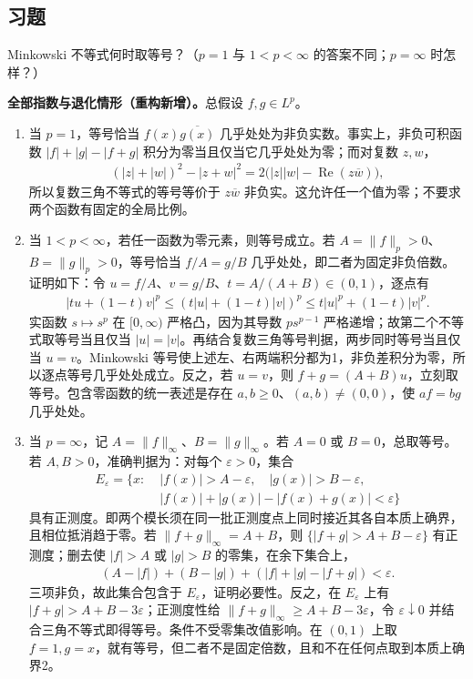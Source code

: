 \documentclass[../../main.tex]{subfiles}
\begin{document}
\subsection*{习题}
\begin{exercise}\label{exercise:ch06-minkowski-equality}
Minkowski 不等式何时取等号？（$p=1$ 与 $1<p<\infty$ 的答案不同；$p=\infty$ 时怎样？）
\end{exercise}
\begin{solution}
\textbf{全部指数与退化情形（重构新增）。}总假设 $f,g\in L^p$。
\begin{enumerate}
\item 当 $p=1$，等号恰当 $f(x)\overline{g(x)}$ 几乎处处为非负实数。事实上，非负可积函数 $|f|+|g|-|f+g|$ 积分为零当且仅当它几乎处处为零；而对复数 $z,w$，
\begin{align*}
(|z|+|w|)^2-|z+w|^2=2\bigl(|z||w|-\operatorname{Re}(z\overline w)\bigr),
\end{align*}
所以复数三角不等式的等号等价于 $z\overline w$ 非负实。这允许任一个值为零；不要求两个函数有固定的全局比例。
\item 当 $1<p<\infty$，若任一函数为零元素，则等号成立。若 $A=\|f\|_p>0$、$B=\|g\|_p>0$，等号恰当 $f/A=g/B$ 几乎处处，即二者为固定非负倍数。证明如下：令 $u=f/A$、$v=g/B$、$t=A/(A+B)\in(0,1)$，逐点有
\begin{align*}
|tu+(1-t)v|^p
\leqslant(t|u|+(1-t)|v|)^p
\leqslant t|u|^p+(1-t)|v|^p.
\end{align*}
实函数 $s\mapsto s^p$ 在 $[0,\infty)$ 严格凸，因为其导数 $ps^{p-1}$ 严格递增；故第二个不等式取等号当且仅当 $|u|=|v|$。再结合复数三角等号判据，两步同时等号当且仅当 $u=v$。Minkowski 等号使上述左、右两端积分都为1，非负差积分为零，所以逐点等号几乎处处成立。反之，若 $u=v$，则 $f+g=(A+B)u$，立刻取等号。包含零函数的统一表述是存在 $a,b\geqslant0$、$(a,b)\ne(0,0)$，使 $af=bg$ 几乎处处。
\item 当 $p=\infty$，记 $A=\|f\|_\infty$、$B=\|g\|_\infty$。若 $A=0$ 或 $B=0$，总取等号。若 $A,B>0$，准确判据为：对每个 $\varepsilon>0$，集合
\begin{align*}
E_\varepsilon=\{x:\;&|f(x)|>A-\varepsilon,\quad |g(x)|>B-\varepsilon,\\
&|f(x)|+|g(x)|-|f(x)+g(x)|<\varepsilon\}
\end{align*}
具有正测度。即两个模长须在同一批正测度点上同时接近其各自本质上确界，且相位抵消趋于零。若 $\|f+g\|_\infty=A+B$，则 $\{|f+g|>A+B-\varepsilon\}$ 有正测度；删去使 $|f|>A$ 或 $|g|>B$ 的零集，在余下集合上，
\begin{align*}
(A-|f|)+(B-|g|)+(|f|+|g|-|f+g|)<\varepsilon.
\end{align*}
三项非负，故此集合包含于 $E_\varepsilon$，证明必要性。反之，在 $E_\varepsilon$ 上有 $|f+g|>A+B-3\varepsilon$；正测度性给 $\|f+g\|_\infty\geqslant A+B-3\varepsilon$，令 $\varepsilon\downarrow0$ 并结合三角不等式即得等号。条件不受零集改值影响。在 $(0,1)$ 上取 $f=1,g=x$，就有等号，但二者不是固定倍数，且和不在任何点取到本质上确界2。
\end{enumerate}
\end{solution}
\end{document}
